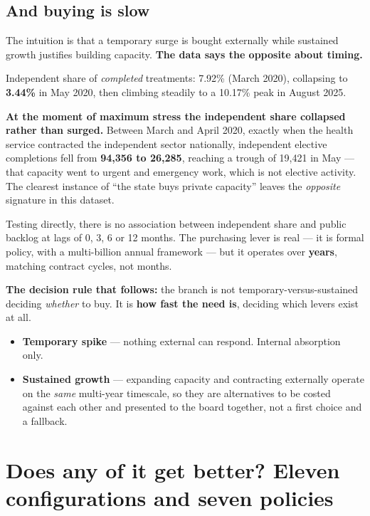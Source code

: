 \documentclass[11pt,a4paper]{article}
\newcommand{\keypoint}[1]{%
  \par\vspace{0.4em}%
  \noindent\colorbox{fed!8}{\parbox{0.98\textwidth}{\vspace{0.2em}#1\vspace{0.2em}}}%
  \par\vspace{0.4em}}
\begin{document}
\subsection{And buying is slow}

The intuition is that a temporary surge is bought externally while sustained growth justifies building
capacity. \textbf{The data says the opposite about timing.}

Independent share of \emph{completed} treatments: 7.92\% (March 2020), collapsing to \textbf{3.44\%} in
May 2020, then climbing steadily to a 10.17\% peak in August 2025.

\keypoint{\textbf{At the moment of maximum stress the independent share collapsed rather than surged.}
Between March and April 2020, exactly when the health service contracted the independent sector
nationally, independent elective completions fell from \textbf{94{,}356 to 26{,}285}, reaching a
trough of 19{,}421 in May --- that capacity went to urgent and
emergency work, which is not elective activity. The clearest instance of ``the state buys private
capacity'' leaves the \emph{opposite} signature in this dataset.}

Testing directly, there is no association between independent share and public backlog at lags of 0, 3,
6 or 12 months. The purchasing lever is real --- it is formal policy, with a multi-billion annual
framework --- but it operates over \textbf{years}, matching contract cycles, not months.

\textbf{The decision rule that follows:} the branch is not temporary-versus-sustained deciding
\emph{whether} to buy. It is \textbf{how fast the need is}, deciding which levers exist at all.

\begin{itemize}[leftmargin=1.3em]
\item \textbf{Temporary spike} --- nothing external can respond. Internal absorption only.
\item \textbf{Sustained growth} --- expanding capacity and contracting externally operate on the
\emph{same} multi-year timescale, so they are alternatives to be costed against each other and
presented to the board together, not a first choice and a fallback.
\end{itemize}

\section{Does any of it get better? Eleven configurations and seven policies}
\label{sec:sweep}
\end{document}
